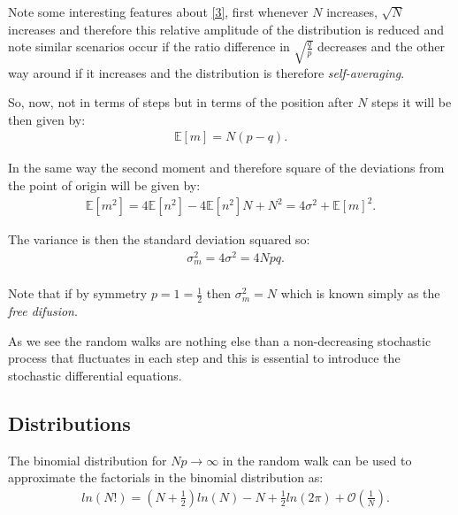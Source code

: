\documentclass[12pt]{article}
\numberwithin{equation}{section}
\begin{document}
Note some interesting features about \ref{3}, first whenever $N$ increases, $\sqrt{N}$ increases and therefore this relative amplitude of the distribution is reduced and note similar scenarios occur if the ratio difference in $\sqrt{\frac{q}{p}}$ decreases and the other way around if it increases and the distribution is therefore \emph{self-averaging}. 

So, now, not in terms of steps but in terms of the position after $N$ steps it will be then given by: 
\begin{equation} \label{1.14}
    \begin{split}
          \mathbb{E}[m] = N(p - q).
    \end{split}
\end{equation}

In the same way the second moment and therefore square of the deviations from the point of origin will be given by:
\begin{equation} \label{1.15}
    \begin{split}
          \mathbb{E}[m^2] = 4 \mathbb{E}[n^2] - 4 \mathbb{E}[n^2]N + N^2 = 4\sigma^2+\mathbb{E}[m]^2.
    \end{split}
\end{equation}

The variance is then the standard deviation squared so: 
\begin{equation} \label{2.16}
    \begin{split}
          & \sigma_m^2 = 4 \sigma ^2 = 4Npq. \\
    \end{split}
\end{equation}

Note that if by symmetry $p = 1 = \frac{1}{2}$ then $\sigma_m^2 = N$ which is known simply as the \emph{free difusion}. 

As we see the random walks are nothing else than a non-decreasing stochastic process that fluctuates in each step and this is essential to introduce the stochastic differential equations.  

\subsection{Distributions}



The binomial distribution for $Np \rightarrow \infty$ in the random walk can be used to approximate the factorials in the binomial distribution as: 
\begin{equation} \label{2.17}
    \begin{split}
          & ln(N!) = \left(N + \frac{1}{2}\right)ln(N) - N + \frac{1}{2}ln(2\pi) + \mathcal{O}(\frac{1}{N}). \\
    \end{split}
\end{equation}
\end{document}
